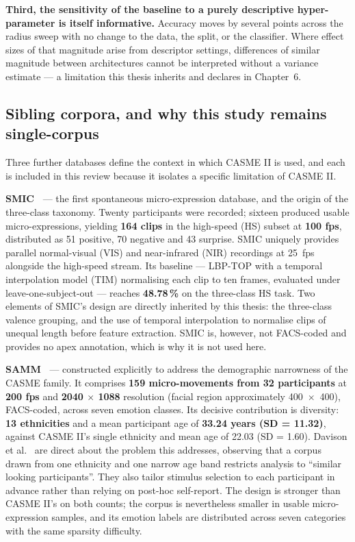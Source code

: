 \textbf{Third, the sensitivity of the baseline to a purely descriptive hyper-parameter is itself informative.} Accuracy moves by several points across the radius sweep with no change to the data, the split, or the classifier. Where effect sizes of that magnitude arise from descriptor settings, differences of similar magnitude between architectures cannot be interpreted without a variance estimate --- a limitation this thesis inherits and declares in Chapter~6.

\subsection{Sibling corpora, and why this study remains single-corpus}
\label{sec:sibling-corpora}

Three further databases define the context in which CASME II is used, and each is included in this review because it isolates a specific limitation of CASME II.

\textbf{SMIC~\cite{liX2013}} --- the first spontaneous micro-expression database, and the origin of the three-class taxonomy. Twenty participants were recorded; sixteen produced usable micro-expressions, yielding \textbf{164 clips} in the high-speed (HS) subset at \textbf{100 fps}, distributed as 51 positive, 70 negative and 43 surprise. SMIC uniquely provides parallel normal-visual (VIS) and near-infrared (NIR) recordings at 25~fps alongside the high-speed stream. Its baseline --- LBP-TOP with a temporal interpolation model (TIM) normalising each clip to ten frames, evaluated under leave-one-subject-out --- reaches \textbf{48.78\,\%} on the three-class HS task. Two elements of SMIC's design are directly inherited by this thesis: the three-class valence grouping, and the use of temporal interpolation to normalise clips of unequal length before feature extraction. SMIC is, however, not FACS-coded and provides no apex annotation, which is why it is not used here.

\textbf{SAMM~\cite{davison2018}} --- constructed explicitly to address the demographic narrowness of the CASME family. It comprises \textbf{159 micro-movements from 32 participants} at \textbf{200 fps} and \textbf{2040 $\times$ 1088} resolution (facial region approximately 400~$\times$~400), FACS-coded, across seven emotion classes. Its decisive contribution is diversity: \textbf{13 ethnicities} and a mean participant age of \textbf{33.24 years (SD = 11.32)}, against CASME II's single ethnicity and mean age of 22.03 (SD = 1.60). Davison et al.~\cite{davison2018} are direct about the problem this addresses, observing that a corpus drawn from one ethnicity and one narrow age band restricts analysis to ``similar looking participants''. They also tailor stimulus selection to each participant in advance rather than relying on post-hoc self-report. The design is stronger than CASME II's on both counts; the corpus is nevertheless smaller in usable micro-expression samples, and its emotion labels are distributed across seven categories with the same sparsity difficulty.

